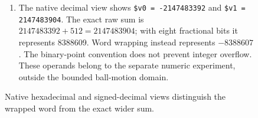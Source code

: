 \begin{figure}[htbp]
\begin{minipage}{\linewidth}
\begin{enumerate}
      \item The native decimal view shows \texttt{\$v0 = -2147483392} and \texttt{\$v1 = 2147483904}. The exact raw sum is $2147483392+512=2147483904$; with eight fractional bits it represents 8388609. Word wrapping instead represents $-8388607$. The binary-point convention does not prevent integer overflow. These operands belong to the separate numeric experiment, outside the bounded ball-motion domain.
    \end{enumerate}
  \end{minipage}
  \caption{Native hexadecimal and signed-decimal views distinguish the wrapped word from the exact wider sum.}
  \label{capture:012-fixed-point-ball-f04-overflow}
  \label{ball-f04-overflow}
\end{figure}
\par
